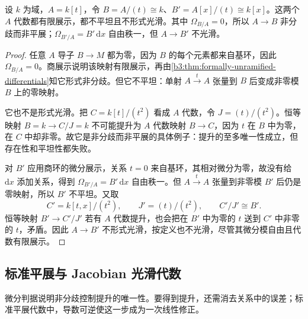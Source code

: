 \begin{proposition}\label{b3:exm:unramified-not-etale}
	设 \(k\) 为域，\(A=k[t]\)，令 \(B=A/(t)\cong k\)、\(B'=A[x]/(t)\cong k[x]\)。这两个 \(A\) 代数都有限展示，都不平坦且不形式光滑。其中 \(\Omega_{B/A}=0\)，所以 \(A\to B\) 非分歧而非平展；\(\Omega_{B'/A}=B'\,\mathrm{d}x\) 自由秩一，但 \(A\to B'\) 不光滑。
\end{proposition}
\begin{proof}
	任意 \(A\) 导子 \(B\to M\) 都为零，因为 \(B\) 的每个元素都来自基环，因此 \(\Omega_{B/A}=0\)。商展示说明该映射有限展示，再由\cref{b3:thm:formally-unramified-differentials}知它形式非分歧。但它不平坦：单射 \(A\xrightarrow{t}A\) 张量到 \(B\) 后变成非零模 \(B\) 上的零映射。

	\ProseParagraphBreak
	它也不是形式光滑。把 \(C=k[t]/(t^2)\) 看成 \(A\) 代数，令 \(J=(t)/(t^2)\)。恒等映射 \(B=k\to C/J=k\) 不可能提升为 \(A\) 代数映射 \(B\to C\)，因为 \(t\) 在 \(B\) 中为零，在 \(C\) 中却非零。故它是非分歧而非平展的具体例子：提升的至多唯一性成立，但存在性和平坦性都失败。

	对 \(B'\) 应用商环的微分展示，关系 \(t=0\) 来自基环，其相对微分为零，故没有给 \(\mathrm{d}x\) 添加关系，得到 \(\Omega_{B'/A}=B'\,\mathrm{d}x\) 自由秩一。但 \(A\xrightarrow{t}A\) 张量到非零模 \(B'\) 后仍是零映射，所以 \(B'\) 不平坦。又取
	\[
		C'=k[t,x]/(t^2),\qquad J'=(t)/(t^2), \qquad C'/J'\cong B'.
	\]
	恒等映射 \(B'\to C'/J'\) 若有 \(A\) 代数提升，也会把在 \(B'\) 中为零的 \(t\) 送到 \(C'\) 中非零的 \(t\)，矛盾。因此 \(A\to B'\) 不形式光滑，按定义也不光滑，尽管其微分模自由且代数有限展示。
\end{proof}

\subsection{标准平展与 Jacobian 光滑代数}
\label{b3:subsec:1405:03}
\label{b3:subsec:1404:04}

微分判据说明非分歧控制提升的唯一性。要得到提升，还需消去关系中的误差；标准平展代数中，导数可逆使这一步成为一次线性修正。

